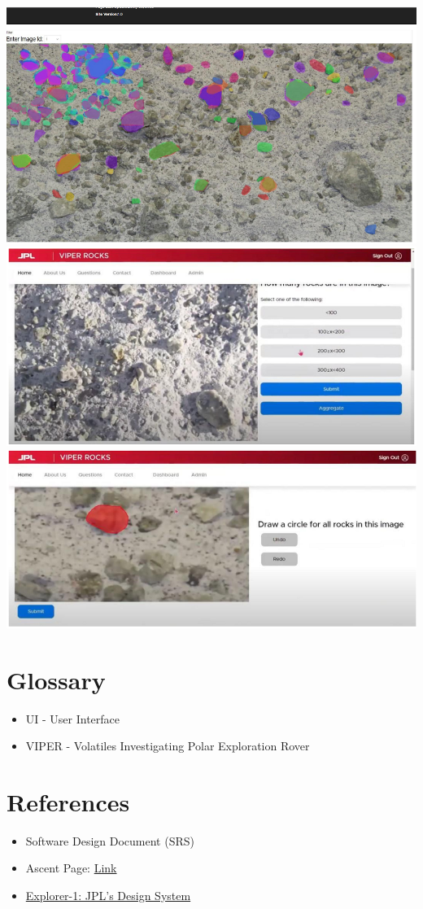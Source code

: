 \documentclass{article}
\begin{document}
\includegraphics{scouting_page}
\includegraphics{scouting_page_2}
\includegraphics{sizing_page}
\section{Glossary}
\begin{itemize}
	\item UI - User Interface
	\item VIPER - Volatiles Investigating Polar Exploration Rover
\end{itemize}

\section{References}
\begin{itemize}
	\item Software Design Document (SRS)
	\item Ascent Page: \href{https://ascent.cysun.org/project/project/view/227}{Link}
	\item \href{https://github.com/nasa-jpl/explorer-1}{Explorer-1: JPL's Design System}
\end{itemize}
\end{document}
